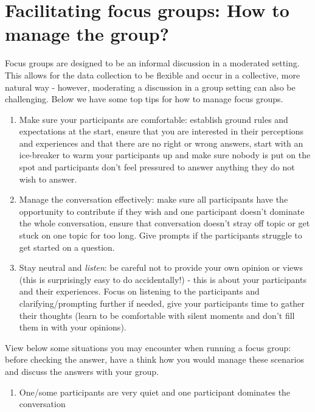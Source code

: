 \documentclass[
  english,
  letterpaper,
  DIV=11,
  numbers=noendperiod]{scrreprt}
\providecommand{\tightlist}{%
  \setlength{\itemsep}{0pt}\setlength{\parskip}{0pt}}
\begin{document}
\section{Facilitating focus groups: How to manage the
group?}\label{facilitating-focus-groups-how-to-manage-the-group}

Focus groups are designed to be an informal discussion in a moderated
setting. This allows for the data collection to be flexible and occur in
a collective, more natural way - however, moderating a discussion in a
group setting can also be challenging. Below we have some top tips for
how to manage focus groups.

\begin{enumerate}
\def\labelenumi{\arabic{enumi}.}
\item
  Make sure your participants are comfortable: establish ground rules
  and expectations at the start, ensure that you are interested in their
  perceptions and experiences and that there are no right or wrong
  answers, start with an ice-breaker to warm your participants up and
  make sure nobody is put on the spot and participants don't feel
  pressured to answer anything they do not wish to answer.
\item
  Manage the conversation effectively: make sure all participants have
  the opportunity to contribute if they wish and one participant doesn't
  dominate the whole conversation, ensure that conversation doesn't
  stray off topic or get stuck on one topic for too long. Give prompts
  if the participants struggle to get started on a question.
\item
  Stay neutral and \emph{listen}: be careful not to provide your own
  opinion or views (this is surprisingly easy to do accidentally!) -
  this is about your participants and their experiences. Focus on
  listening to the participants and clarifying/prompting further if
  needed, give your participants time to gather their thoughts (learn to
  be comfortable with silent moments and don't fill them in with your
  opinions).
\end{enumerate}

View below some situations you may encounter when running a focus group:
before checking the answer, have a think how you would manage these
scenarios and discuss the answers with your group.

\begin{enumerate}
\def\labelenumi{\arabic{enumi}.}
\tightlist
\item
  One/some participants are very quiet and one participant dominates the
  conversation
\end{enumerate}
\end{document}
